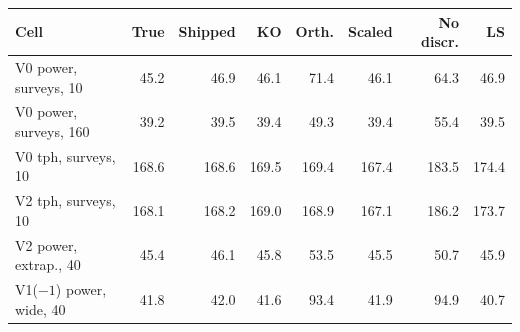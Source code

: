 \begin{tabular}{@{}lrrrrrrr@{}}
\toprule
Cell & True & Shipped & KO & Orth. & Scaled & No discr. & LS \\
\midrule
V0 power, surveys, 10 & 45.2 & 46.9 & 46.1 & 71.4 & 46.1 & 64.3 & 46.9 \\
V0 power, surveys, 160 & 39.2 & 39.5 & 39.4 & 49.3 & 39.4 & 55.4 & 39.5 \\
V0 tph, surveys, 10 & 168.6 & 168.6 & 169.5 & 169.4 & 167.4 & 183.5 & 174.4 \\
V2 tph, surveys, 10 & 168.1 & 168.2 & 169.0 & 168.9 & 167.1 & 186.2 & 173.7 \\
V2 power, extrap., 40 & 45.4 & 46.1 & 45.8 & 53.5 & 45.5 & 50.7 & 45.9 \\
V1($-1$) power, wide, 40 & 41.8 & 42.0 & 41.6 & 93.4 & 41.9 & 94.9 & 40.7 \\
\bottomrule
\end{tabular}
